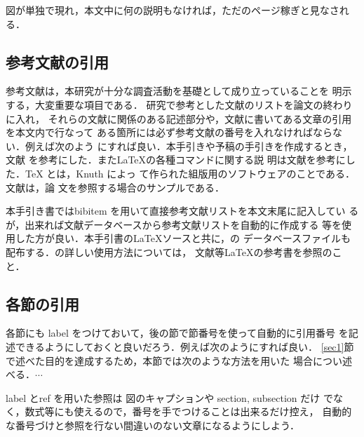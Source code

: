 図が単独で現れ，本文中に何の説明もなければ，ただのページ稼ぎと見なされ
る．

\subsection{参考文献の引用}
参考文献は，本研究が十分な調査活動を基礎として成り立っていることを
明示する，大変重要な項目である．
研究で参考とした文献のリストを論文の終わりに入れ，
それらの文献に関係のある記述部分や，文献に書いてある文章の引用を本文内で行なって
ある箇所には必ず参考文献の番号を入れなければならない．例えば次のよう
にすれば良い．本手引きや予稿の手引きを作成するとき，文献
\cite{kinosita}を参考にした．また\LaTeX の各種コマンドに関する説
明は文献\cite{okumura}を参考にした．\TeX \cite{knuth} とは，Knuth によっ
て作られた組版用のソフトウェアのことである．文献\cite{labelName}は，論
文を参照する場合のサンプルである．



本手引き書ではbibitem を用いて直接参考文献リストを本文末尾に記入してい
るが，出来れば文献データベースから参考文献リストを自動的に作成する
\BibTeX 等を使用した方が良い．本手引書の\LaTeX ソースと共に，\BibTeX の
データベースファイルも配布する．\BibTeX の詳しい使用方法については，
文献\cite{okumura}等\LaTeX の参考書を参照のこと．

\subsection{各節の引用}
各節にも label をつけておいて，後の節で節番号を使って自動的に引用番号
を記述できるようにしておくと良いだろう．例えば次のようにすれば良い．
\ref{sec1}節で述べた目的を達成するため，本節では次のような方法を用いた
場合につい述べる．$\cdots$

label とref を用いた参照は 図のキャプションや section, subsection だけ
でなく，数式等にも使えるので，番号を手でつけることは出来るだけ控え，
自動的な番号づけと参照を行ない間違いのない文章になるようにしよう．